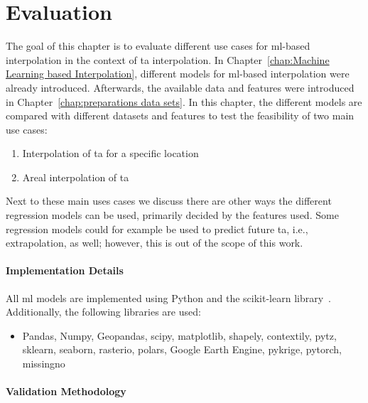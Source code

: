 \chapter{Evaluation}
\label{chap:Evaluation}

The goal of this chapter is to evaluate different use cases for \gls{ml}-based interpolation in the context of \gls{ta} interpolation. In Chapter~\ref{chap:Machine Learning based Interpolation}, different models for \gls{ml}-based interpolation were already introduced. Afterwards, the available data and features were introduced in Chapter~\ref{chap:preparations data sets}. In this chapter, the different models are compared with different datasets and features to test the feasibility of two main use cases:

\begin{enumerate}
  \item Interpolation of \gls{ta} for a specific location
  \item Areal interpolation of \gls{ta}
\end{enumerate}

Next to these main uses cases we discuss there are other ways the different regression models can be used, primarily decided by the features used. Some regression models could for example be used to predict future \gls{ta}, i.e., extrapolation, as well; however, this is out of the scope of this work.

\subsubsection{Implementation Details}

All \gls{ml} models are implemented using Python and the scikit-learn library~\cite{scikit-learn}. Additionally, the following libraries are used:

\begin{itemize}
  \item Pandas, Numpy, Geopandas, scipy, matplotlib, shapely, contextily, pytz, sklearn, seaborn, rasterio, polars, Google Earth Engine, pykrige, pytorch, missingno
\end{itemize}

\subsubsection{Validation Methodology}
\label{sec:validation methodology}

